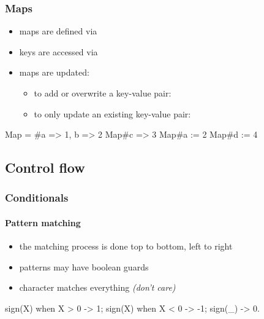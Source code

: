 \documentclass[a4paper,landscape,10pt]{article}
\begin{document}
\begin{multicols*}{2}
  \subsubsection{Maps}

  \begin{itemize}
    \item maps are defined via 
    \item keys are accessed via 
    \item maps are updated:
          \begin{itemize}
            \item to add or overwrite a key-value pair: 
            \item to only update an existing key-value pair: 
          \end{itemize}
  \end{itemize}

  \begin{erlang}
Map = #{a => 1, b => 2} %
Map#{c => 3} %
Map#{a := 2} %
Map#{d := 4} %
\end{erlang}

  \subsection{Control flow}

  \subsubsection{Conditionals}

  \paragraph{Pattern matching}

  \begin{itemize}
    \item the matching process is done top to bottom, left to right
    \item patterns may have boolean guards
    \item character \ierlang{_} matches everything \textit{(don't care)}
  \end{itemize}

  \begin{erlang}
sign(X) when X > 0 -> 1;
sign(X) when X < 0 -> -1;
sign(_) -> 0.
\end{erlang}


\end{multicols*}
\end{document}
